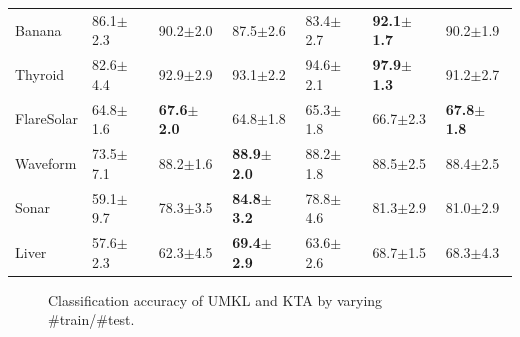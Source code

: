 \begin{table}[!thbp]
\begin{center}
{\begin{tabular}{l|l|lllll}
Banana         &86.1$\pm$2.3     &90.2$\pm$2.0   &87.5$\pm$2.6 &83.4$\pm$2.7 &{\bf 92.1$\pm$1.7} &90.2$\pm$1.9\\
Thyroid        &82.6$\pm$4.4  &92.9$\pm$2.9    &93.1$\pm$2.2 &94.6$\pm$2.1 &{\bf 97.9$\pm$1.3} &91.2$\pm$2.7\\
FlareSolar     &64.8$\pm$1.6 &{\bf67.6$\pm$2.0}   &64.8$\pm$1.8 &65.3$\pm$1.8  &66.7$\pm$2.3  &{\bf67.8$\pm$1.8}\\
Waveform    &73.5$\pm$7.1 &88.2$\pm$1.6   &{\bf 88.9$\pm$2.0} &88.2$\pm$1.8 &88.5$\pm$2.5 &88.4$\pm$2.5\\
Sonar         &59.1$\pm$9.7 &78.3$\pm$3.5&{\bf 84.8$\pm$3.2} &78.8$\pm$4.6 &81.3$\pm$2.9 &81.0$\pm$2.9\\
Liver       &57.6$\pm$2.3       &62.3$\pm$4.5 &{\bf 69.4$\pm$2.9} &63.6$\pm$2.6 &68.7$\pm$1.5 &68.3$\pm$4.3\\
\hline
\end{tabular}
}
\end{center}
\end{table}


\begin{figure}[!t]
\begin{center}
\caption{Classification accuracy of UMKL and KTA by varying \#train/\#test. }
\end{center}
\end{figure}

